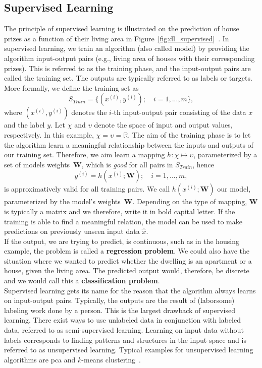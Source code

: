 \subsection{Supervised Learning} \label{sec:ml_supervised}
The principle of supervised learning is illustrated on the prediction of house prizes as a function of their living area in Figure~\ref{fig:dl_supervised}~\cite{Ng2012StanfordNotes}. In supervised learning, we train an algorithm (also called model) by providing the algorithm input-output pairs (e.g., living area of houses with their corresponding prizes). This is referred to as the training phase, and the input-output pairs are called the training set. The outputs are typically referred to as labels or targets. More formally, we define the training set as
\begin{equation}
   S_{Train} = \{(x^{(i)}, y^{(i)}); \quad i = 1,...,m\},
   \label{eq:training_set}
\end{equation}
where $(x^{(i)}, y^{(i)})$ denotes the $i$-th input-output pair consisting of the data $x$ and the label $y$. Let $\chi$ and $\upsilon$ denote the space of input and output values, respectively. In this example, $\chi = \upsilon = \mathbb{R}$. The aim of the training phase is to let the algorithm learn a meaningful relationship between the inputs and outputs of our training set. Therefore, we aim learn a mapping $h : \chi \mapsto \upsilon$, parameterized by a set of models weights~$\textbf{W}$, which is \textit{good} for all pairs in $S_{Train}$, hence
\begin{equation}
   y^{(i)} = h(x^{(i)}; \mathbf{W}); \quad i = 1,...,m,
   \label{eq:model}
\end{equation}
is approximatively valid for all training pairs. We call $h(x^{(i)}; \mathbf{W})$ our model, parameterized by the model's weights~$\textbf{W}$. Depending on the type of mapping, $\mathbf{W}$ is typically a matrix and we therefore, write it in bold capital letter. If the training is able to find a meaningful relation, the model can be used to make predictions on previously unseen input data $\hat{x}$.\\
If the output, we are trying to predict, is continuous, such as in the housing example, the problem is called a \textbf{regression problem}. We could also have the situation where we wanted to predict whether the dwelling is an apartment or a house, given the living area. The predicted output would, therefore, be discrete and we would call this a \textbf{classification problem}.\\
Supervised learning gets its name for the reason that the algorithm always learns on input-output pairs. Typically, the outputs  are the result of (laborsome) labeling work done by a person. This is the largest drawback of supervised learning. There exist ways to use unlabeled data in conjunction with labeled data, referred to as semi-supervised learning. Learning on input data without labels corresponds to finding patterns and structures in the input space and is referred to as unsupervised learning. Typical examples for unsupervised learning algorithms are \gls{pca} and $k$-means clustering~\cite{Goodfellow2016DeepLearning}.\\
